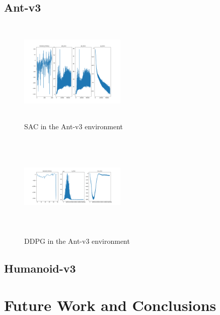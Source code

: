 \documentclass[conference]{IEEEtran}
\begin{document}
\blindtext

\subsection{Ant-v3}

\begin{figure}
    \includegraphics[width=0.45\textwidth, height=5cm]{sac-ant}
    \caption{SAC in the Ant-v3 environment}
\end{figure}

\begin{figure}
    \includegraphics[width=0.45\textwidth, height=5cm]{ddpg-ant}
    \caption{DDPG in the Ant-v3 environment}
\end{figure}

\blindtext

\subsection{Humanoid-v3}

\blindtext

\section{Future Work and Conclusions}

\blindtext[2]




\end{document}
